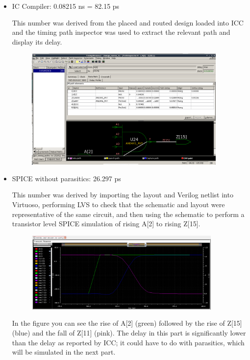 \documentclass[11pt]{article}
\begin{document}
\begin{itemize}
	\item IC Compiler: 0.08215 ns = 82.15 ps
	
	This number was derived from the placed and routed design loaded into ICC and the timing path inspector was used to extract the relevant path and display its delay.
	
	\begin{figure}[H]
		\centerline{\includegraphics[height=6cm]{icc_path_delay.png}}
	\end{figure}

	\item SPICE without parasitics: 26.297 ps
	
	This number was derived by importing the layout and Verilog netlist into Virtuoso, performing LVS to check that the schematic and layout were representative of the same circuit, and then using the schematic to perform a transistor level SPICE simulation of rising A[2] to rising Z[15].
	
	\begin{figure}[H]
		\centerline{\includegraphics[height=4cm]{spice_path_delay.png}}
	\end{figure}

	In the figure you can see the rise of A[2] (green) followed by the rise of Z[15] (blue) and the fall of Z[11] (pink). The delay in this part is significantly lower than the delay as reported by ICC; it could have to do with parasitics, which will be simulated in the next part.
	

\end{itemize}
\end{document}
